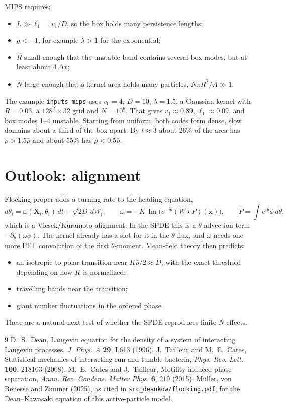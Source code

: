 \documentclass[11pt]{article}
\newcommand{\code}[1]{\texttt{#1}}
\newcommand{\rt}{\tilde\rho}
\newcommand{\rb}{\bar\rho}
\begin{document}
MIPS requires:
\begin{itemize}
  \item $L\gg\ell_1 = v_1/D$, so the box holds many persistence lengths;
  \item $g<-1$, for example $\lambda>1$ for the exponential;
  \item $R$ small enough that the unstable band contains several box modes,
        but at least about $4\,\Delta x$;
  \item $N$ large enough that a kernel area holds many particles,
        $N\pi R^2/A\gg1$.
\end{itemize}
The example \code{inputs\_mips} uses $v_0=4$, $D=10$, $\lambda=1.5$, a
Gaussian kernel with $R=0.03$, a $128^2\times32$ grid and $N=10^6$. That
gives $v_1\approx0.89$, $\ell_1\approx0.09$, and box modes 1--4 unstable.
Starting from uniform, both codes form dense, slow domains about a third of
the box apart. By $t\approx3$ about 26\% of the area has $\rt>1.5\rb$ and
about 55\% has $\rt<0.5\rb$.

\section{Outlook: alignment}

Flocking proper adds a turning rate to the heading equation,
\begin{equation}
  d\theta_i = \omega(\mathbf{X}_i,\theta_i)\,dt + \sqrt{2D}\,dW_i, \qquad
  \omega = -K\,\operatorname{Im}\bigl(e^{-i\theta}(W\star P)(\mathbf{x})\bigr),
  \qquad P = \int e^{i\theta}\phi\,d\theta ,
\end{equation}
which is a Vicsek/Kuramoto alignment. In the SPDE this is a $\theta$-advection
term $-\partial_\theta(\omega\phi)$. The kernel already has a slot for it in
the $\theta$ flux, and $\omega$ needs one more FFT convolution of the first
$\theta$-moment. Mean-field theory then predicts:
\begin{itemize}
  \item an isotropic-to-polar transition near $K\rb/2\approx D$, with the
        exact threshold depending on how $K$ is normalized;
  \item travelling bands near the transition;
  \item giant number fluctuations in the ordered phase.
\end{itemize}
These are a natural next test of whether the SPDE reproduces finite-$N$
effects.

\begin{thebibliography}{9}
 D.~S.~Dean, Langevin equation for the density of a system of
  interacting Langevin processes, \emph{J. Phys. A} \textbf{29}, L613 (1996).
 J.~Tailleur and M.~E.~Cates, Statistical mechanics of
  interacting run-and-tumble bacteria, \emph{Phys. Rev. Lett.} \textbf{100},
  218103 (2008).
 M.~E.~Cates and J.~Tailleur, Motility-induced phase separation,
  \emph{Annu. Rev. Condens. Matter Phys.} \textbf{6}, 219 (2015).
 Müller, von Renesse and Zimmer (2025), as cited in
  \code{src\_deankow/flocking.pdf}, for the Dean--Kawasaki equation of this
  active-particle model.
\end{thebibliography}
\end{document}
